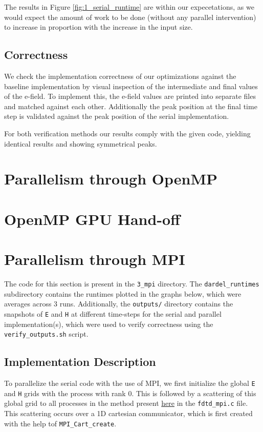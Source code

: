 \documentclass[a4paper,10pt]{article}
\begin{document}
The results in Figure \ref{fig:1_serial_runtime} are within our expecetations, as we would expect the amount of work to be done (without any parallel intervention) to increase in proportion with the increase in the input size.  

\subsection{Correctness}
We check the implementation correctness of our optimizations against the baseline implementation by visual inspection of the intermediate and final values of the e-field.
To implement this, the e-field values are printed into separate files and matched against each other.
Additionally the peak position at the final time step is validated against the peak position of the serial implementation. 

For both verification methods our results comply with the given code, yielding identical results and showing symmetrical peaks.

\section{Parallelism through OpenMP}

\section{OpenMP GPU Hand-off}

\section{Parallelism through MPI}
\label{sec:3_mpi}
The code for this section is present in the \verb|3_mpi| directory. The \verb|dardel_runtimes| subdirectory contains the runtimes plotted in the graphs below, which were averages across 3 runs. Additionally, the \verb|outputs/| directory contains the snapshots of \verb|E| and \verb|H| at different time-steps for the serial and parallel implementation(s), which were used to verify correctness using the \verb|verify_outputs.sh| script.

\subsection{Implementation Description}
To parallelize the serial code with the use of MPI, we first initialize the global \verb|E| and \verb|H| grids with the process with rank 0. This is followed by a scattering of this global grid to all processes in the method present \href{https://github.com/paulmyr/DD2356-MethodsHPC/blob/master/5_project/3_mpi/fdtd_mpi.c#L25}{here} in the \verb|fdtd_mpi.c| file. This scattering occurs over a 1D cartesian communicator, which is first created with the help tof \verb|MPI_Cart_create|. 
\end{document}
